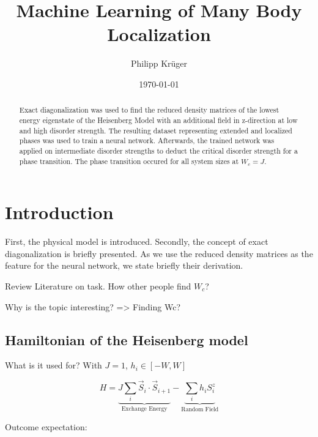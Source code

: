 \documentclass[reprint,amsmath,amssymb,aps,prb]{revtex4-2}
\begin{document}
%

\title{Machine Learning of Many Body Localization}

\author{Philipp Krüger}

\date{\today}%

\begin{abstract}
Exact diagonalization was used to find the reduced density matrices of the lowest energy eigenstate of the Heisenberg Model with an additional field in z-direction at low and high disorder strength. The resulting dataset representing extended and localized phases was used to train a neural network. Afterwards, the trained network was applied on intermediate disorder strengths to deduct the critical disorder strength for a phase transition. The phase transition occured for all system sizes at $W_c = J$. 
\end{abstract}


\maketitle

\section{Introduction}

First, the physical model is introduced. Secondly, the concept of exact diagonalization is briefly presented. As we use the reduced density matrices as the feature for the neural network, we state briefly their derivation.

Review Literature on task. How other people find $W_c$?

Why is the topic interesting? => Finding Wc?

\subsection{Hamiltonian of the Heisenberg model}

What is it used for? With $J=1$, $h_i \in \left[-W, W\right]$

\begin{equation}
	H=\underbrace{J\sum_i \vec{S}_i\cdot\vec{S}_{i+1}}_{\text{Exchange Energy}}-\underbrace{\sum_ih_iS_i^z}_{\text{Random Field}}
\end{equation}

Outcome expectation: 
\end{document}
